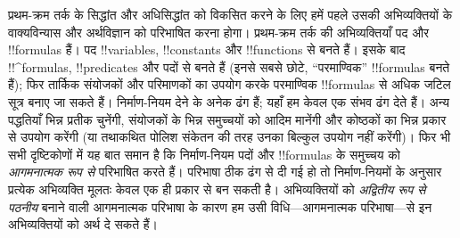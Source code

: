 \documentclass[../../../include/open-logic-section]{subfiles}
\begin{document}


प्रथम-क्रम तर्क के सिद्धांत और अधिसिद्धांत को विकसित करने के लिए हमें पहले
उसकी अभिव्यक्तियों के वाक्यविन्यास और अर्थविज्ञान को परिभाषित करना होगा।
प्रथम-क्रम तर्क की अभिव्यक्तियाँ पद और !!{formula}s हैं। पद !!{variable}s,
!!{constant}s और !!{function}s से बनते हैं। इसके बाद !!^{formula}s,
!!{predicate}s और पदों से बनते हैं (इनसे सबसे छोटे, ``परमाण्विक''
!!{formula}s बनते हैं); फिर तार्किक संयोजकों और परिमाणकों का उपयोग करके
परमाण्विक !!{formula}s से अधिक जटिल सूत्र बनाए जा सकते हैं। निर्माण-नियम
देने के अनेक ढंग हैं; यहाँ हम केवल एक संभव ढंग देते हैं। अन्य पद्धतियाँ भिन्न
प्रतीक चुनेंगी, संयोजकों के भिन्न समुच्चयों को आदिम मानेंगी और कोष्ठकों का
भिन्न प्रकार से उपयोग करेंगी (या तथाकथित पोलिश संकेतन की तरह उनका बिल्कुल
उपयोग नहीं करेंगी)। फिर भी सभी दृष्टिकोणों में यह बात समान है कि निर्माण-नियम
पदों और !!{formula}s के समुच्चय को \emph{आगमनात्मक रूप से} परिभाषित करते हैं।
परिभाषा ठीक ढंग से दी गई हो तो निर्माण-नियमों के अनुसार प्रत्येक अभिव्यक्ति
मूलतः केवल एक ही प्रकार से बन सकती है। अभिव्यक्तियों को \emph{अद्वितीय रूप से
पठनीय} बनाने वाली आगमनात्मक परिभाषा के कारण हम उसी विधि---आगमनात्मक
परिभाषा---से इन अभिव्यक्तियों को अर्थ दे सकते हैं।
\end{document}
